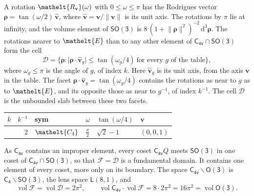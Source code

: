 \documentclass[10pt,a4paper]{article}
\numberwithin{equation}{section}
\newcommand{\eltfont}[1]{{\let\sigma\eltsigma\mathelt{#1}}}
\newcommand{\grp}[1]{\mathsf{#1}}
\newcommand{\cls}[1]{\eltfont{#1}}
\newcommand{\elt}[1]{\eltfont{#1}}
\newcommand{\dirvec}[3]{(#1, #2, #3)}
\newcommand{\unitaxis}{\hat{\mathbf{v}}}
\newcommand{\vv}{\mathbf{v}}
\newcommand{\diff}{\mathrm{d}}
\newcommand{\vol}{\operatorname{vol}}
\newcommand{\rodrigues}{\boldsymbol{\rho}}
\newcommand{\fcell}{\mathcal{D}}
\newcommand{\fdomain}{\mathcal{F}}
\newcommand{\lensspace}[2]{\mathsf{L}(#1, #2)}
\begin{document}
\leavevmode\label{n:vector.rodrigues}\label{n:vector.unitaxis}A rotation $\elt{R_{\vv}}(\omega)$ with $0 \le \omega \le \pi$ has the Rodrigues vector $\rodrigues = \tan(\omega/2)\,\unitaxis$, where $\unitaxis = \vv/\lVert\vv\rVert$ is its unit axis. The rotations by $\pi$ lie at infinity, and the volume element of \href{SO3.pdf}{$\grp{SO(3)}$} is $8\,(1 + \lVert\rodrigues\rVert^2)^{-2}\,\diff^3\rodrigues$.
\leavevmode\label{n:set.cell}The rotations nearer to $\elt{E}$ than to any other element of $\grp{C_{4v}} \cap \grp{SO(3)}$ form the cell
\begin{equation}\label{e:cell}\fcell = \bigl\{\rodrigues : \lvert\rodrigues\cdot\unitaxis_g\rvert \le \tan(\omega_g/4)\ \text{for every $g$ of the table}\bigr\},\end{equation}
where $\omega_g \le \pi$ is the angle of $g$, of index $k$. Here $\unitaxis_g$ is its unit axis, from the axis $\vv$ in the table. The facet $\rodrigues\cdot\unitaxis_g = \tan(\omega_g/4)$ contains the rotations as near to $g$ as to $\elt{E}$, and its opposite those as near to $g^{-1}$, of index $k^{-1}$. The cell $\fcell$ is the unbounded slab between these two facets.
{\small{\renewcommand{\arraystretch}{1.3}\begin{longtable}{@{}rrllll@{}}\toprule
$k$ & $k^{-1}$ & sym & $\omega$ & $\tan(\omega/4)$ & $\vv$\\\midrule\endhead
\bottomrule\endfoot\endlastfoot
1 & 2 & $\cls{C_{4}}$ & $\tfrac{\pi}{2}$ & $\sqrt{2} - 1$ & $\dirvec{0}{0}{1}$\\
\bottomrule\end{longtable}}}

\leavevmode\label{n:set.fundamental}As $\grp{C_{4v}}$ contains an improper element, every coset $\grp{C_{4v}}Q$ meets \href{SO3.pdf}{$\grp{SO(3)}$} in one coset of $\grp{C_{4v}} \cap \grp{SO(3)}$, so that $\fdomain = \fcell$ is a fundamental domain. It contains one element of every coset, more only on its boundary.
\leavevmode\label{n:set.lens}The space $\grp{C_{4v}}\backslash\grp{O(3)}$ is $\grp{C_{4}}\backslash\grp{SO(3)}$, the lens space $\lensspace{8}{1}$, and
\begin{equation}\label{e:volume}\vol\fdomain = \vol\fcell = 2\pi^2,\qquad \vol\grp{C_{4v}}\cdot\vol\fdomain = 8\cdot 2\pi^2 = 16\pi^2 = \vol\grp{O(3)}.\end{equation}
\end{document}
